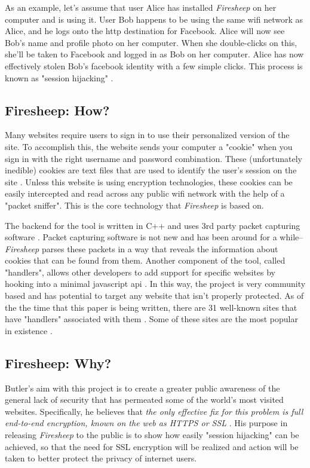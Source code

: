 \documentclass[11pt]{article}
\begin{document}
\begin{multicols}{2}
As an example, let's assume that user Alice has installed \emph{Firesheep} on her computer and is using it. User Bob happens to be using the same wifi network as Alice, and he logs onto the http destination for Facebook. Alice will now see Bob's name and profile photo on her computer. When she double-clicks on this, she'll be taken to Facebook and logged in as Bob on her computer. Alice has now effectively stolen Bob's facebook identity with a few simple clicks. This process is known as "session hijacking" \cite{hijacking}.

\subsection{Firesheep: How?}
Many websites require users to sign in to use their personalized version of the site. To accomplish this, the website sends your computer a "cookie" when you sign in with the right username and password combination. These (unfortunately inedible) cookies are text files that are used to identify the user's session on the site \cite{codebutler_main}. Unless this website is using encryption technologies, these cookies can be easily intercepted and read across any public wifi network with the help of a "packet sniffer". This is the core technology that \emph{Firesheep} is based on.

The backend for the tool is written in C++ and uses 3rd party packet capturing software \cite{github}. Packet capturing software is not new and has been around for a while--\emph{Firesheep} parses these packets in a way that reveals the information about cookies that can be found from them. Another component of the tool, called "handlers", allows other developers to add support for specific websites by hooking into a minimal javascript api \cite{github}. In this way, the project is very community based and has potential to target any website that isn't properly protected. As of the the time that this paper is being written, there are 31 well-known sites that have "handlers" associated with them \cite{github}. Some of these sites are the most popular in existence \cite{alexa}.

\subsection{Firesheep: Why?}
Butler's aim with this project is to create a greater public awareness of the general lack of security that has permeated some of the world's most visited websites. Specifically, he believes that \emph{the only effective fix for this problem is full end-to-end encryption, known on the web as HTTPS or SSL} \cite{codebutler_main}. His purpose in releasing \emph{Firesheep} to the public is to show how easily "session hijacking" can be achieved, so that the need for SSL encryption will be realized and action will be taken to better protect the privacy of internet users.


\end{multicols}
\end{document}
